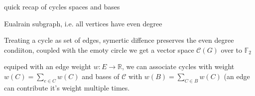 \begin{frame}{quick recap of cycles spaces and bases}
    \begin{definition}[cycle]
        Eualrain subgraph, i.e. all vertices have even degree
    \end{definition}
    \begin{definition}
        Treating a cycle as set of edges, symertic diffence preserves the even degree condiiton, coupled with the emoty circle we get a vector space $\mathcal{C}(G)$ over to $\mathbb{F}_2$
    \end{definition}
    \begin{definition}
    equiped with an edge weight $w:E\to \mathbb{R}$, we can associate cycles with weight $w(C)=\sum_{e\in C}w(C)$ and bases of $\mathcal{C}$ with $w(B)=\sum_{C\in B}w(C)$ (an edge can contribute it's weight multiple times.
    \end{definition}
\end{frame}
